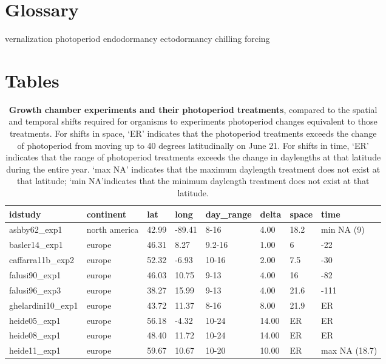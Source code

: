 \documentclass{article}
\begin{document}
\section*{Glossary}
vernalization
photoperiod
endodormancy
ectodormancy
chilling
forcing

\section* {Tables}
\begin{table}[ht]
\centering
\caption{\textbf{Growth chamber experiments and their photoperiod treatments}, compared to the spatial and temporal shifts required for organisms to experiments photoperiod changes equivalent to those treatments. For shifts in space, `ER' indicates that the photoperiod treatments exceeds the change of photoperiod from moving up to 40 degrees latitudinally on June 21. For shifts in time, `ER' indicates that the range of photoperiod treatments exceeds the change in daylengths at that latitude during the entire year. `max NA' indicates that the maximum daylength treatment does not exist at that latitude; `min NA'indicates that the minimum daylength treatment does not exist at that latitude.} 
\label{table:phototreats}
\begin{tabular}{|p{}|p{}|p{}|p{}|p{}|p{}|p{}|p{}|}
  \hline
idstudy & continent & lat & long & day\_range & delta & space & time \\ 
  \hline
ashby62\_exp1 & north america & 42.99 & -89.41 & 8-16 & 4.00 & 18.2 & min NA (9) \\ 
  basler14\_exp1 & europe & 46.31 & 8.27 & 9.2-16 & 1.00 & 6 & -22 \\ 
  caffarra11b\_exp2 & europe & 52.32 & -6.93 & 10-16 & 2.00 & 7.5 & -30 \\ 
  falusi90\_exp1 & europe & 46.03 & 10.75 & 9-13 & 4.00 & 16 & -82 \\ 
  falusi96\_exp3 & europe & 38.27 & 15.99 & 9-13 & 4.00 & 21.6 & -111 \\ 
  ghelardini10\_exp1 & europe & 43.72 & 11.37 & 8-16 & 8.00 & 21.9 & ER \\ 
  heide05\_exp1 & europe & 56.18 & -4.32 & 10-24 & 14.00 & ER & ER \\ 
  heide08\_exp1 & europe & 48.40 & 11.72 & 10-24 & 14.00 & ER & ER \\ 
  heide11\_exp1 & europe & 59.67 & 10.67 & 10-20 & 10.00 & ER & max NA (18.7) \\ 

\end{tabular}
\end{table}
\end{document}
